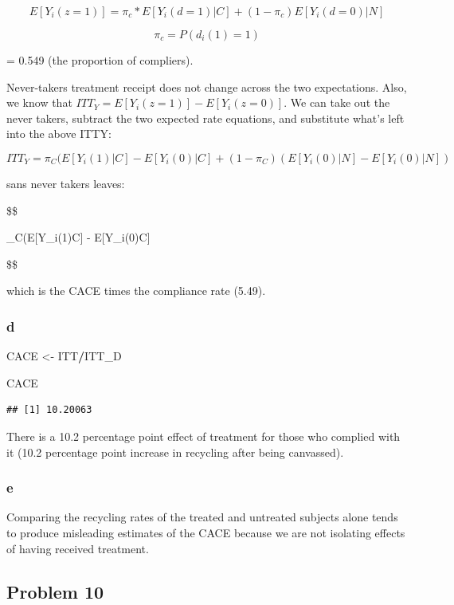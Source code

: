 \documentclass[
]{article}
\newenvironment{Shaded}{\begin{snugshade}}{\end{snugshade}}
\newcommand{\NormalTok}[1]{#1}
\newcommand{\OtherTok}[1]{\textcolor[rgb]{0.56,0.35,0.01}{#1}}
\newcommand{\SpecialCharTok}[1]{\textcolor[rgb]{0.81,0.36,0.00}{\textbf{#1}}}
\begin{document}
\[
E[Y_i(z = 1)] = \pi_c * E[Y_i(d=1)|C] + (1 - \pi_c)E[Y_i(d=0)|N]
\]

\[
\pi_c = P(d_i(1) = 1)
\]

= 0.549 (the proportion of compliers).

Never-takers treatment receipt does not change across the two
expectations. Also, we know that
\(ITT_Y = E[Y_i(z = 1)] - E[Y_i(z=0)]\). We can take out the never
takers, subtract the two expected rate equations, and substitute what's
left into the above ITTY:

\[
ITT_Y = \pi_C(E[Y_i(1)|C] - E[Y_i(0)|C] + (1-\pi_C)(E[Y_i(0)|N] - E[Y_i(0) |N])
\]

sans never takers leaves:

\$\$

\pi\_C(E{[}Y\_i(1)\textbar C{]} - E{[}Y\_i(0)\textbar C{]}

\$\$

which is the CACE times the compliance rate (5.49).

\subsubsection{d}\label{d-1}

\begin{Shaded}
\begin{Highlighting}[]
\NormalTok{CACE }\OtherTok{\textless{}{-}}\NormalTok{ ITT}\SpecialCharTok{/}\NormalTok{ITT\_D}

\NormalTok{CACE}
\end{Highlighting}
\end{Shaded}

\begin{verbatim}
## [1] 10.20063
\end{verbatim}

There is a 10.2 percentage point effect of treatment for those who
complied with it (10.2 percentage point increase in recycling after
being canvassed).

\subsubsection{e}\label{e}

Comparing the recycling rates of the treated and untreated subjects
alone tends to produce misleading estimates of the CACE because we are
not isolating effects of having received treatment.

\subsection{Problem 10}\label{problem-10}
\end{document}
